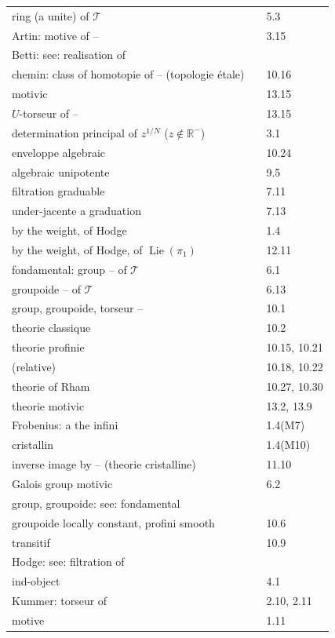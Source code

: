 \documentclass[12pt,a4paper]{article}
\theoremstyle{plain}
\theoremstyle{definition}
\theoremstyle{remark}
\DeclareMathOperator{\Lie}{Lie}
\newcommand{\RR}{\mathbb{R}}
\begin{document}
\begin{tabular}{lll}
ring (a unite) of $\mathcal{T}$ & & 5.3 \\
Artin: motive of  -- & & 3.15 \\
Betti: see: realisation of & & \\
chemin: class of homotopie of -- (topologie étale) & & 10.16 \\
\quad motivic & & 13.15 \\
\quad $U$-torseur of -- & & 13.15 \\
determination principal of $z^{1/N}$ ($z \notin \RR^-$) & & 3.1 \\
enveloppe algebraic & & 10.24 \\
\quad algebraic unipotente & & 9.5 \\
filtration graduable & & 7.11 \\
\quad under-jacente a graduation & & 7.13 \\
\quad by the weight, of Hodge & & 1.4 \\
\quad by the weight, of Hodge, of $\Lie(\pi_1)$ & & 12.11 \\
fondamental: group -- of $\mathcal{T}$ & & 6.1 \\
\quad groupoide -- of $\mathcal{T}$ & & 6.13 \\
group, groupoide, torseur -- & & 10.1 \\
\quad theorie classique & & 10.2 \\
\quad theorie profinie & & 10.15, 10.21 \\
\quad \quad (relative) & & 10.18, 10.22 \\
\quad theorie of Rham & & 10.27, 10.30 \\
\quad theorie motivic & & 13.2, 13.9 \\
Frobenius: a the infini & & 1.4(M7) \\
\quad cristallin & & 1.4(M10) \\
\quad inverse image by -- (theorie cristalline) & & 11.10 \\
Galois group motivic & & 6.2 \\
group, groupoide: see: fondamental & & \\
groupoide locally constant, profini smooth & & 10.6 \\
\quad transitif & & 10.9 \\
Hodge: see: filtration of & & \\
ind-object & & 4.1 \\
Kummer: torseur of & & 2.10, 2.11 \\
motive & & 1.11 \\

\end{tabular}
\end{document}
